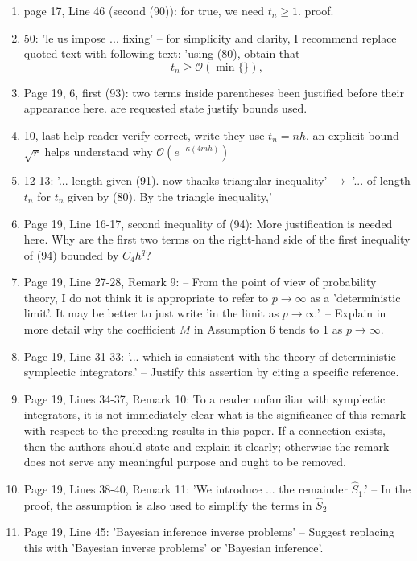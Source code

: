 \documentclass{article}
\begin{document}
\begin{enumerate}[label=(\arabic*)]
		\item page 17, Line 46 (second (90)): for true, we need $t_n\geq 1$. proof.
		\item 50: 'le us impose ... fixing' -- for simplicity and clarity, I recommend replace quoted text with following text: 'using (80), obtain that 
		\begin{equation}\label{eq:equation_91}t_n\geq \mathcal{O}(\min\{ \}),\end{equation}
		\item Page 19, 6, first (93): two terms inside parentheses been justified before their appearance here. are requested state justify bounds used.
		\item 10, last help reader verify correct, write they use $t_n=nh$. an explicit bound $\sqrt{r}$ helps understand why $\mathcal O(e^{-\kappa (4mh)})$
		\item 12-13: '... length given (91). now thanks triangular inequality' $\to$ '... of length $t_n$ for $t_n$ given by (80). By the triangle inequality,'
		\item Page 19, Line 16-17, second inequality of (94): More justification is needed here. Why are the first two terms on the right-hand side of the first inequality of (94) bounded by $C_4 h^q$?
		\item Page 19, Line 27-28, Remark 9: -- From the point of view of probability theory, I do not think it is appropriate to refer to $p\to\infty$ as a 'deterministic limit'. It may be better to just write 'in the limit as $p\to\infty$'. -- Explain in more detail why the coefficient $M$ in Assumption 6 tends to 1 as $p\to\infty$.
		\item Page 19, Line 31-33: '... which is consistent with the theory of deterministic symplectic integrators.' -- Justify this assertion by citing a specific reference.
		\item Page 19, Lines 34-37, Remark 10: To a reader unfamiliar with symplectic integrators, it is not immediately clear what is the significance of this remark with respect to the preceding results in this paper. If a connection exists, then the authors should state and explain it clearly; otherwise the remark does not serve any meaningful purpose and ought to be removed.
		\item Page 19, Lines 38-40, Remark 11: 'We introduce ... the remainder $\widehat{S}_1$.' -- In the proof, the assumption is also used to simplify the terms in $\widehat{S}_2$
		\item Page 19, Line 45: 'Bayesian inference inverse problems' -- Suggest replacing this with 'Bayesian inverse problems' or 'Bayesian inference'.

\end{enumerate}
\end{document}
